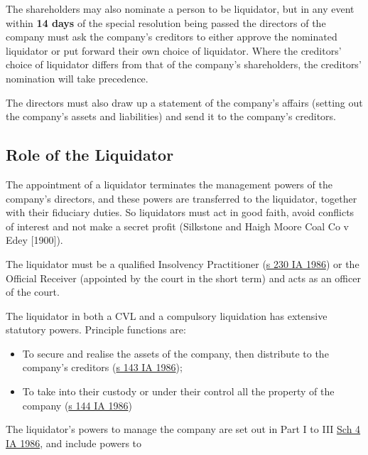 \documentclass[
]{article}
\providecommand{\tightlist}{%
  \setlength{\itemsep}{0pt}\setlength{\parskip}{0pt}}
\begin{document}
The shareholders may also nominate a person to be liquidator, but in any
event within \textbf{14 days} of the special resolution being passed the
directors of the company must ask the company's creditors to either
approve the nominated liquidator or put forward their own choice of
liquidator. Where the creditors' choice of liquidator differs from that
of the company's shareholders, the creditors' nomination will take
precedence.

The directors must also draw up a statement of the company's affairs
(setting out the company's assets and liabilities) and send it to the
company's creditors.

\hypertarget{role-of-the-liquidator}{%
\subsection{Role of the Liquidator}\label{role-of-the-liquidator}}

The appointment of a liquidator terminates the management powers of the
company's directors, and these powers are transferred to the liquidator,
together with their fiduciary duties. So liquidators must act in good
faith, avoid conflicts of interest and not make a secret profit
(Silkstone and Haigh Moore Coal Co v Edey {[}1900{]}).

The liquidator must be a qualified Insolvency Practitioner
(\href{https://www.legislation.gov.uk/ukpga/1986/45/section/230}{s 230
IA 1986}) or the Official Receiver (appointed by the court in the short
term) and acts as an officer of the court.

The liquidator in both a CVL and a compulsory liquidation has extensive
statutory powers. Principle functions are:

\begin{itemize}
\tightlist
\item
  To secure and realise the assets of the company, then distribute to
  the company's creditors
  (\href{https://www.legislation.gov.uk/ukpga/1986/45/section/143}{s 143
  IA 1986});
\item
  To take into their custody or under their control all the property of
  the company
  (\href{https://www.legislation.gov.uk/ukpga/1986/45/section/144}{s 144
  IA 1986})
\end{itemize}

The liquidator's powers to manage the company are set out in Part I to
III \href{https://www.legislation.gov.uk/ukpga/1986/45/schedule/4}{Sch 4
IA 1986}, and include powers to
\end{document}
